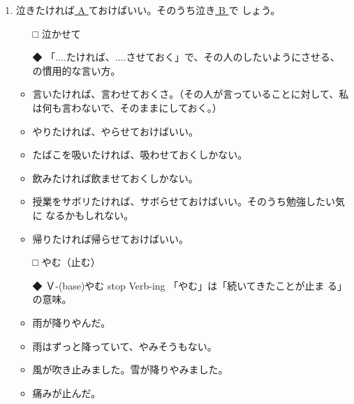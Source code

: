 \documentclass[
uplatex,
b5paper,
10pt,
dvipdfmx
]{jsbook}
\begin{document}
\begin{enumerate}
\item 泣きたければ\underline{ A  }ておけばいい。そのうち泣き\underline{ B  }で
      しょう。
\begin{itemize}
\item[□] 泣かせて
\item[◆] 「....たければ、....させておく」で、その人のしたいようにさせる、
	  の慣用的な言い方。
\end{itemize}
\begin{itemize}
\item 言いたければ、言わせておくさ。（その人が言っていることに対して、私
      は何も言わないで、そのままにしておく。）
\item やりたければ、やらせておけばいい。
\item たばこを吸いたければ、吸わせておくしかない。
\item 飲みたければ飲ませておくしかない。
\item 授業をサボリたければ、サボらせておけばいい。そのうち勉強したい気に
      なるかもしれない。
\item 帰りたければ帰らせておけばいい。
\end{itemize}
\begin{itemize}
\item[□] やむ（止む）
\item[◆] Ｖ-(base)やむ stop Verb-ing 「やむ」は「続いてきたことが止ま
	  る」の意味。
\end{itemize}
\begin{itemize}
\item 雨が降りやんだ。
\item 雨はずっと降っていて、やみそうもない。
\item 風が吹き止みました。雪が降りやみました。
\item 痛みが止んだ。
\end{itemize}


\end{enumerate}
\end{document}
